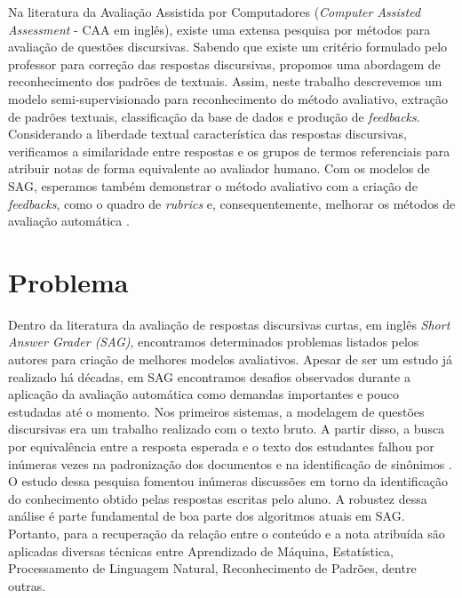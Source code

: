 Na literatura da Avaliação Assistida por Computadores (\textit{Computer Assisted Assessment} - CAA em inglês), existe uma extensa pesquisa por métodos para avaliação de questões discursivas. Sabendo que existe um critério formulado pelo professor para correção das respostas discursivas, propomos uma abordagem de reconhecimento dos padrões de textuais. Assim, neste trabalho descrevemos um modelo semi-supervisionado para reconhecimento do método avaliativo, extração de padrões textuais, classificação da base de dados e produção de \textit{feedbacks}. Considerando a liberdade textual característica das respostas discursivas, verificamos a similaridade entre respostas e os grupos de termos referenciais para atribuir notas de forma equivalente ao avaliador humano. Com os modelos de SAG, esperamos também demonstrar o método avaliativo com a criação de \textit{feedbacks}, como o quadro de \textit{rubrics} \cite{arter2006} e, consequentemente, melhorar os métodos de avaliação automática \cite{spalenza2016SBIE}.

\section{Problema} 
\label{sec-problema}

Dentro da literatura da avaliação de respostas discursivas curtas, em inglês \textit{Short Answer Grader (SAG)}, encontramos determinados problemas listados pelos autores para criação de melhores modelos avaliativos. Apesar de ser um estudo já realizado há décadas, em SAG encontramos desafios observados durante a aplicação da avaliação automática como demandas importantes e pouco estudadas até o momento. Nos primeiros sistemas, a modelagem de questões discursivas era um trabalho realizado com o texto bruto. A partir disso, a busca por equivalência entre a resposta esperada e o texto dos estudantes falhou por inúmeras vezes na padronização dos documentos e na identificação de sinônimos \cite{leffa2003}. O estudo dessa pesquisa fomentou inúmeras discussões em torno da identificação do conhecimento obtido pelas respostas escritas pelo aluno. A robustez dessa análise é parte fundamental de boa parte dos algoritmos atuais em SAG. Portanto,  para a recuperação da relação entre o conteúdo e a nota atribuída são aplicadas diversas técnicas entre Aprendizado de Máquina, Estatística, Processamento de Linguagem Natural, Reconhecimento de Padrões, dentre outras.


